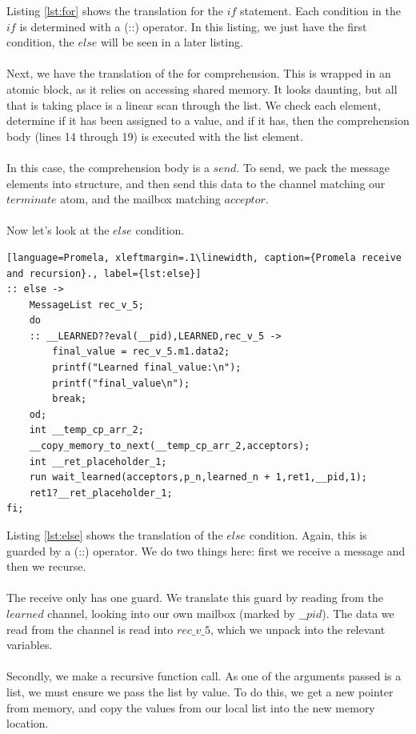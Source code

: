 Listing \ref{lst:for} shows the translation for the $if$ statement. Each condition in the $if$ is determined with a (::) operator. In this listing, we just have the first condition, the $else$ will be seen in a later listing. 
\\ \\
Next, we have the translation of the for comprehension. This is wrapped in an atomic block, as it relies on accessing shared memory. It looks daunting, but all that is taking place is a linear scan through the list. We check each element, determine if it has been assigned to a value, and if it has, then the comprehension body (lines 14 through 19) is executed with the list element.
\\ \\
In this case, the comprehension body is a $send$. To send, we pack the message elements into structure, and then send this data to the channel matching our $terminate$ atom, and the mailbox matching $acceptor$.
\\ \\
Now let's look at the $else$ condition.
\begin{lstlisting}[language=Promela, xleftmargin=.1\linewidth, caption={Promela receive and recursion}., label={lst:else}]
:: else -> 
    MessageList rec_v_5;
    do
    :: __LEARNED??eval(__pid),LEARNED,rec_v_5 -> 
        final_value = rec_v_5.m1.data2;
        printf("Learned final_value:\n");
        printf("final_value\n");
        break;
    od;
    int __temp_cp_arr_2;
    __copy_memory_to_next(__temp_cp_arr_2,acceptors);
    int __ret_placeholder_1;
    run wait_learned(acceptors,p_n,learned_n + 1,ret1,__pid,1);
    ret1?__ret_placeholder_1;
fi;
\end{lstlisting}
Listing \ref{lst:else} shows the translation of the $else$ condition. Again, this is guarded by a (::) operator. We do two things here: first we receive a message and then we recurse.
\\ \\
The receive only has one guard. We translate this guard by reading from the $learned$ channel, looking into our own mailbox (marked by $\_\_pid$). The data we read from the channel is read into $rec\_v\_5$, which we unpack into the relevant variables.
\\ \\
Secondly, we make a recursive function call. As one of the arguments passed is a list, we must ensure we pass the list by value. To do this, we get a new pointer from memory, and copy the values from our local list into the new memory location.
